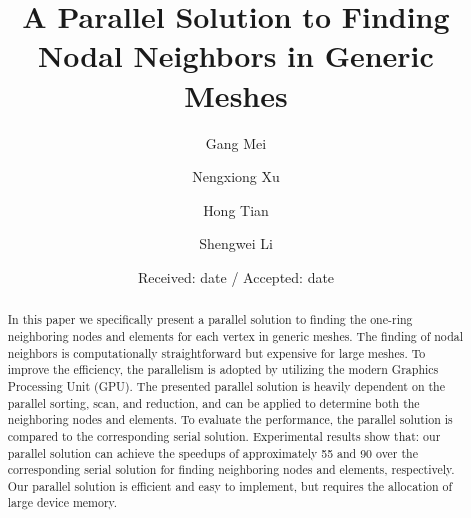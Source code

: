 \documentclass[twocolumn]{svjour3}          \smartqed  \usepackage{graphicx}
\begin{document}
\title{A Parallel Solution to Finding Nodal Neighbors in Generic Meshes}




\author{Gang Mei         \and
        Nengxiong Xu     \and
        Hong Tian        \and
        Shengwei Li
}




\date{Received: date / Accepted: date}



\maketitle

\begin{abstract}
In this paper we specifically present a parallel solution to finding the 
one-ring neighboring nodes and elements for each vertex in generic meshes. 
The finding of nodal neighbors is computationally straightforward but 
expensive for large meshes. To improve the efficiency, the parallelism is 
adopted by utilizing the modern Graphics Processing Unit (GPU). The 
presented parallel solution is heavily dependent on the parallel sorting, 
scan, and reduction, and can be applied to determine both the neighboring 
nodes and elements. To evaluate the performance, the parallel solution is 
compared to the corresponding serial solution. Experimental results show 
that: our parallel solution can achieve the speedups of approximately 55 and 
90 over the corresponding serial solution for finding neighboring nodes and 
elements, respectively. Our parallel solution is efficient and easy to 
implement, but requires the allocation of large device memory.
\end{abstract}
\end{document}
